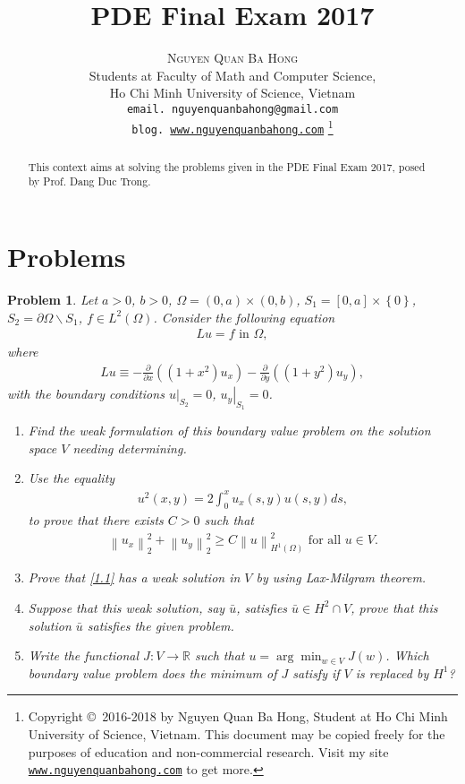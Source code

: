 \documentclass[11pt,a4paper]{article}
\title{PDE Final Exam 2017}
\author{\textsc{Nguyen Quan Ba Hong}\\
{\small Students at Faculty of Math and Computer Science,}\\ 
{\small Ho Chi Minh University of Science, Vietnam} \\
{\small \texttt{email. nguyenquanbahong@gmail.com}}\\
{\small \texttt{blog. \url{www.nguyenquanbahong.com}} 
\footnote{Copyright \copyright\ 2016-2018 by Nguyen Quan Ba Hong, Student at Ho Chi Minh University of Science, Vietnam. This document may be copied freely for the purposes of education and non-commercial research. Visit my site \texttt{\url{www.nguyenquanbahong.com}} to get more.}}}
\numberwithin{equation}{section}
\numberwithin{equation}{section}
\newtheorem{problem}{Problem}[section]
\begin{document}
\maketitle
\begin{abstract}
This context aims at solving the problems given in the PDE Final Exam 2017, posed by Prof. Dang Duc Trong.
\end{abstract}
\newpage
\tableofcontents
\newpage
\section{Problems}
\begin{problem}\label{problem1.1}
Let $a>0$, $b>0$, $\Omega =\left(0,a\right)\times \left(0,b\right)$, ${S_1} = \left[ {0,a} \right] \times \left\{ 0 \right\}$, ${S_2} = \partial \Omega \backslash {S_1}$, $f\in L^2\left(\Omega\right)$. Consider the following equation
\begin{align}
\label{1.1}
Lu =f \mbox{ in } \Omega ,
\end{align}
where 
\begin{align}
Lu \equiv  - \frac{\partial }{{\partial x}}\left( {\left( {1 + {x^2}} \right){u_x}} \right) - \frac{\partial }{{\partial y}}\left( {\left( {1 + {y^2}} \right){u_y}} \right),
\end{align}
with the boundary conditions ${\left. u \right|_{{S_2}}} = 0$, ${\left. {{u_y}} \right|_{{S_1}}} = 0$.
\begin{enumerate}
\item Find the weak formulation of this boundary value problem on the solution space $V$ needing determining.
\item Use the equality 
\begin{align}
{u^2}\left( {x,y} \right) = 2\int_0^x {{u_x}\left( {s,y} \right)u\left( {s,y} \right)ds},
\end{align}
to prove that there exists $C>0$ such that
\begin{align}
\label{1.4}
{\left\| {{u_x}} \right\|_2^2} + {\left\| {{u_y}} \right\|_2^2} \ge C\left\| u \right\|_{{H^1}\left( \Omega  \right)}^2 \mbox{ for all } u \in V.
\end{align}
\item Prove that \eqref{1.1} has a weak solution in $V$ by using Lax-Milgram theorem.
\item Suppose that this weak solution, say $\bar u$, satisfies $\bar u \in {H^2} \cap V$, prove that this solution $\bar u$ satisfies the given problem.
\item Write the functional $J: V\to \mathbb{R}$ such that $u = \arg {\min _{w \in V}}J\left( w \right)$. Which boundary value problem does the minimum of $J$ satisfy if $V$ is replaced by $H^1$?
\end{enumerate}
\end{problem} 
\end{document}
